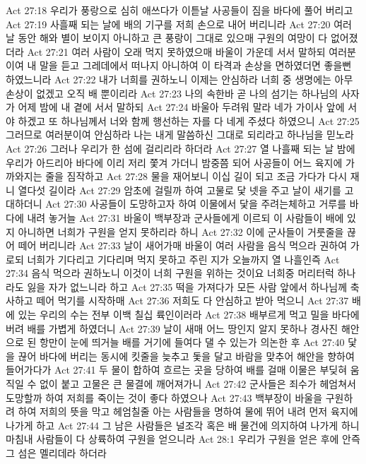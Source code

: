 Act 27:18  우리가 풍랑으로 심히 애쓰다가 이튿날 사공들이 짐을 바다에 풀어 버리고
Act 27:19  사흘째 되는 날에 배의 기구를 저희 손으로 내어 버리니라
Act 27:20  여러 날 동안 해와 별이 보이지 아니하고 큰 풍랑이 그대로 있으매 구원의 여망이 다 없어졌더라
Act 27:21  여러 사람이 오래 먹지 못하였으매 바울이 가운데 서서 말하되 여러분이여 내 말을 듣고 그레데에서 떠나지 아니하여 이 타격과 손상을 면하였더면 좋을뻔 하였느니라
Act 27:22  내가 너희를 권하노니 이제는 안심하라 너희 중 생명에는 아무 손상이 없겠고 오직 배 뿐이리라
Act 27:23  나의 속한바 곧 나의 섬기는 하나님의 사자가 어제 밤에 내 곁에 서서 말하되
Act 27:24  바울아 두려워 말라 네가 가이사 앞에 서야 하겠고 또 하나님께서 너와 함께 행선하는 자를 다 네게 주셨다 하였으니
Act 27:25  그러므로 여러분이여 안심하라 나는 내게 말씀하신 그대로 되리라고 하나님을 믿노라
Act 27:26  그러나 우리가 한 섬에 걸리리라 하더라
Act 27:27  열 나흘째 되는 날 밤에 우리가 아드리아 바다에 이리 저리 쫓겨 가더니 밤중쯤 되어 사공들이 어느 육지에 가까와지는 줄을 짐작하고
Act 27:28  물을 재어보니 이십 길이 되고 조금 가다가 다시 재니 열다섯 길이라
Act 27:29  암초에 걸릴까 하여 고물로 닻 넷을 주고 날이 새기를 고대하더니
Act 27:30  사공들이 도망하고자 하여 이물에서 닻을 주려는체하고 거루를 바다에 내려 놓거늘
Act 27:31  바울이 백부장과 군사들에게 이르되 이 사람들이 배에 있지 아니하면 너희가 구원을 얻지 못하리라 하니
Act 27:32  이에 군사들이 거룻줄을 끊어 떼어 버리니라
Act 27:33  날이 새어가매 바울이 여러 사람을 음식 먹으라 권하여 가로되 너희가 기다리고 기다리며 먹지 못하고 주린 지가 오늘까지 열 나흘인즉
Act 27:34  음식 먹으라 권하노니 이것이 너희 구원을 위하는 것이요 너희중 머리터럭 하나라도 잃을 자가 없느니라 하고
Act 27:35  떡을 가져다가 모든 사람 앞에서 하나님께 축사하고 떼어 먹기를 시작하매
Act 27:36  저희도 다 안심하고 받아 먹으니
Act 27:37  배에 있는 우리의 수는 전부 이백 칠십 륙인이러라
Act 27:38  배부르게 먹고 밀을 바다에 버려 배를 가볍게 하였더니
Act 27:39  날이 새매 어느 땅인지 알지 못하나 경사진 해안으로 된 항만이 눈에 띄거늘 배를 거기에 들여다 댈 수 있는가 의논한 후
Act 27:40  닻을 끊어 바다에 버리는 동시에 킷줄을 늦추고 돛을 달고 바람을 맞추어 해안을 향하여 들어가다가
Act 27:41  두 물이 합하여 흐르는 곳을 당하여 배를 걸매 이물은 부딪혀 움직일 수 없이 붙고 고물은 큰 물결에 깨어져가니
Act 27:42  군사들은 죄수가 헤엄쳐서 도망할까 하여 저희를 죽이는 것이 좋다 하였으나
Act 27:43  백부장이 바울을 구원하려 하여 저희의 뜻을 막고 헤엄칠줄 아는 사람들을 명하여 물에 뛰어 내려 먼저 육지에 나가게 하고
Act 27:44  그 남은 사람들은 널조각 혹은 배 물건에 의지하여 나가게 하니 마침내 사람들이 다 상륙하여 구원을 얻으니라
Act 28:1  우리가 구원을 얻은 후에 안즉 그 섬은 멜리데라 하더라
